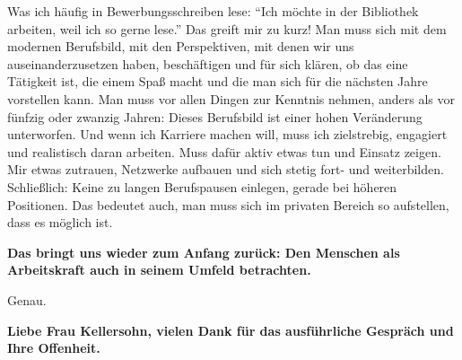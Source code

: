 \documentclass[a4paper,
fontsize=11pt,
oneside,
numbers=noperiodatend,
parskip=half-,
bibliography=totoc,
final
]{scrartcl}
\begin{document}
Was ich häufig in Bewerbungsschreiben lese: \enquote{Ich möchte in der
Bibliothek arbeiten, weil ich so gerne lese.} Das greift mir zu kurz!
Man muss sich mit dem modernen Berufsbild, mit den Perspektiven, mit
denen wir uns auseinanderzusetzen haben, beschäftigen und für sich
klären, ob das eine Tätigkeit ist, die einem Spaß macht und die man sich
für die nächsten Jahre vorstellen kann. Man muss vor allen Dingen zur
Kenntnis nehmen, anders als vor fünfzig oder zwanzig Jahren: Dieses
Berufsbild ist einer hohen Veränderung unterworfen. Und wenn ich
Karriere machen will, muss ich zielstrebig, engagiert und realistisch
daran arbeiten. Muss dafür aktiv etwas tun und Einsatz zeigen. Mir etwas
zutrauen, Netzwerke aufbauen und sich stetig fort- und weiterbilden.
Schließlich: Keine zu langen Berufspausen einlegen, gerade bei höheren
Positionen. Das bedeutet auch, man muss sich im privaten Bereich so
aufstellen, dass es möglich ist.

\textbf{Das bringt uns wieder zum Anfang zurück: Den Menschen als
Arbeitskraft auch in seinem Umfeld betrachten.}

Genau.

\textbf{Liebe Frau Kellersohn, vielen Dank für das ausführliche Gespräch
und Ihre Offenheit.}

\end{document}
